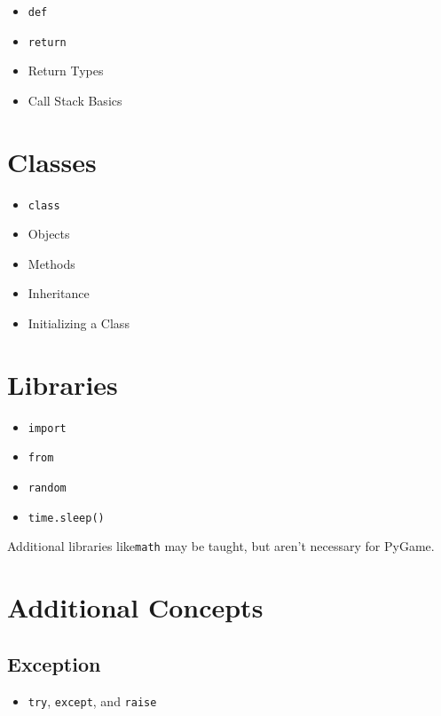 \documentclass{article}
\begin{document}
\begin{itemize}
    \item \verb|def|
    \item \verb|return|
    \item Return Types
    \item Call Stack Basics
\end{itemize}

\section{Classes}

\begin{itemize}
    \item \verb|class|
    \item Objects
    \item Methods
    \item Inheritance
    \item Initializing a Class
\end{itemize}

\section{Libraries}

\begin{itemize}
    \item \verb|import|
    \item \verb|from|
    \item \verb|random|
    \item \verb|time.sleep()|
\end{itemize}

Additional libraries like\verb|math| may be taught, but aren't necessary for PyGame.

\section{Additional Concepts}

\subsection{Exception}

\begin{itemize}
    \item \verb|try|, \verb|except|, and \verb|raise|
\end{itemize}
\end{document}
